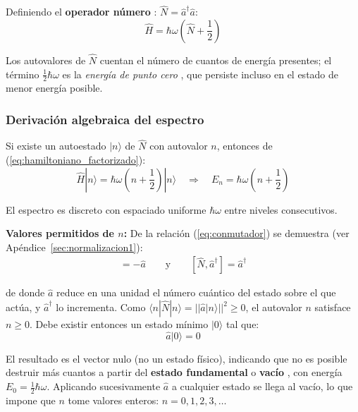 Definiendo el \textbf{operador número} \cite{dirac1930}: $\hat{N} = \hat{a}^\dagger\hat{a}$:
\begin{equation}
	\boxed{\hat{H} = \hbar\omega\left(\hat{N} + \frac{1}{2}\right)}
	\label{eq:hamiltoniano_factorizado}
\end{equation}

Los autovalores de $\hat{N}$ cuentan el número de cuantos de energía presentes; el término $\frac{1}{2}\hbar\omega$ es la \emph{energía de punto cero} \citep{planck1911}, que persiste incluso en el estado de menor energía posible.



\subsubsection{Derivación algebraica del espectro}

Si existe un autoestado $|n\rangle$ de $\hat{N}$ con autovalor $n$, entonces de (\ref{eq:hamiltoniano_factorizado}):
\begin{equation}
	\hat{H}|n\rangle = \hbar\omega\left(n + \frac{1}{2}\right)|n\rangle \quad \Longrightarrow \quad
	\boxed{E_n = \hbar\omega\left(n + \frac{1}{2}\right)}
	\label{eq:espe_disc_ener}
\end{equation}

El espectro es discreto con espaciado uniforme $\hbar\omega$ entre niveles consecutivos.

\textbf{Valores permitidos de $n$:} De la relación (\ref{eq:conmutador}) se demuestra (ver Apéndice~\ref{sec:normalizacion1}):
\vspace{-15pt}	
\begin{align}
	[\hat{N}, \hat{a}] = -\hat{a} \qquad \text{y} \qquad [\hat{N}, \hat{a}^\dagger] = \hat{a}^\dagger
\end{align}

de donde $\hat{a}$ reduce en una unidad el número cuántico del estado sobre el que actúa, y $\hat{a}^\dagger$ lo incrementa. Como $\langle n|\hat{N}|n\rangle = ||\hat{a}|n\rangle||^2 \geq 0$, el autovalor $n$ satisface $n \geq 0$. Debe existir entonces un estado mínimo $|0\rangle$ tal que:
\begin{equation}
	\hat{a}|0\rangle = 0
\end{equation}

El resultado es el vector nulo (no un estado físico), indicando que no es posible destruir más cuantos a partir del \textbf{estado fundamental} o \textbf{vacío} \citep{dirac1930}, con energía $E_0 = \frac{1}{2}\hbar\omega$. Aplicando sucesivamente $\hat{a}$ a cualquier estado se llega al vacío, lo que impone que $n$ tome valores enteros: $\boxed{n = 0, 1, 2, 3, \ldots}$

